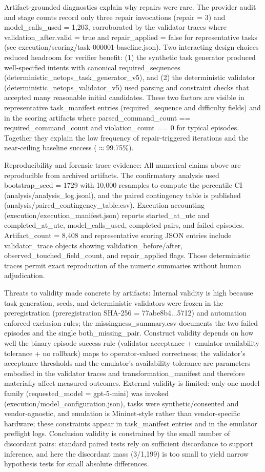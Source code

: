\documentclass[conference]{IEEEtran}
\begin{document}
Artifact‑grounded diagnostics explain why repairs were rare. The provider audit and stage counts record only three repair invocations (repair = 3) and model\_calls\_used = 1,203, corroborated by the validator traces where validation\_after.valid = true and repair\_applied = false for representative tasks (see execution/scoring/task-000001-baseline.json). Two interacting design choices reduced headroom for verifier benefit: (1) the synthetic task generator produced well‑specified intents with canonical required\_sequences (deterministic\_netops\_task\_generator\_v5), and (2) the deterministic validator (deterministic\_netops\_validator\_v5) used parsing and constraint checks that accepted many reasonable initial candidates. These two factors are visible in representative task\_manifest entries (required\_sequence and difficulty fields) and in the scoring artifacts where parsed\_command\_count == required\_command\_count and violation\_count == 0 for typical episodes. Together they explain the low frequency of repair-triggered iterations and the near‑ceiling baseline success (\ensuremath{\approx}99.75\%).

Reproducibility and forensic trace evidence: All numerical claims above are reproducible from archived artifacts. The confirmatory analysis used bootstrap\_seed = 1729 with 10,000 resamples to compute the percentile CI (analysis/analysis\_log.jsonl), and the paired contingency table is published (analysis/paired\_contingency\_table.csv). Execution accounting (execution/execution\_manifest.json) reports started\_at\_utc and completed\_at\_utc, model\_calls\_used, completed pairs, and failed episodes. Artifact\_count = 8,408 and representative scoring JSON entries include validator\_trace objects showing validation\_before/after, observed\_touched\_field\_count, and repair\_applied flags. Those deterministic traces permit exact reproduction of the numeric summaries without human adjudication.

Threats to validity made concrete by artifacts: Internal validity is high because task generation, seeds, and deterministic validators were frozen in the preregistration (preregistration SHA‑256 = 77abe8b4...5712) and automation enforced exclusion rules; the missingness\_summary.csv documents the two failed episodes and the single both\_missing\_pair. Construct validity depends on how well the binary episode success rule (validator acceptance + emulator availability tolerance + no rollback) maps to operator‑valued correctness; the validator's acceptance thresholds and the emulator's availability tolerance are parameters embodied in the validator traces and transformation\_manifest and therefore materially affect measured outcomes. External validity is limited: only one model family (requested\_model = gpt-5-mini) was invoked (execution/model\_configuration.json), tasks were synthetic/consented and vendor‑agnostic, and emulation is Mininet‑style rather than vendor‑specific hardware; these constraints appear in task\_manifest entries and in the emulator preflight logs. Conclusion validity is constrained by the small number of discordant pairs: standard paired tests rely on sufficient discordance to support inference, and here the discordant mass (3/1,199) is too small to yield narrow hypothesis tests for small absolute differences.
\end{document}
